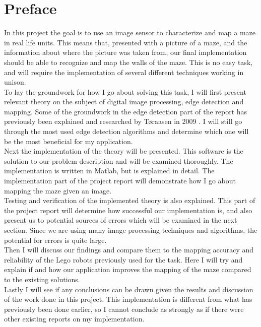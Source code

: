 \section{Preface}
In this project the goal is to use an image sensor to characterize and map a maze in real life units. This means that, presented with a picture of a maze, and the information about where the picture was taken from, our final implementation should be able to recognize and map the walls of the maze. This is no easy task, and will require the implementation of several different techniques working in unison.\\

To lay the groundwork for how I go about solving this task, I will first present relevant theory on the subject of digital image processing, edge detection and mapping. Some of the groundwork in the edge detection part of the report has previously been explained and researched by Tøraasen in 2009 \cite{tor}. I will still go through the most used edge detection algorithms and determine which one will be the most beneficial for my application.\\

Next the implementation of the theory will be presented. This software is the solution to our problem description and will be examined thoroughly. The implementation is written in Matlab, but is explained in detail. The implementation part of the project report will demonstrate how I go about mapping the maze given an image.\\

Testing and verification of the implemented theory is also explained. This part of the project report will determine how successful our implementation is, and also present us to potential sources of errors which will be examined in the next section. Since we are using many image processing techniques and algorithms, the potential for errors is quite large.\\

Then I will discuss our findings and compare them to the mapping accuracy and reliability of the Lego robots previously used for the task. Here I will try and explain if and how our application improves the mapping of the maze compared to the existing solutions. \\

Lastly I will see if any conclusions can be drawn given the results and discussion of the work done in this project. This implementation is different from what has previously been done earlier, so I cannot conclude as strongly as if there were other existing reports on my implementation.







